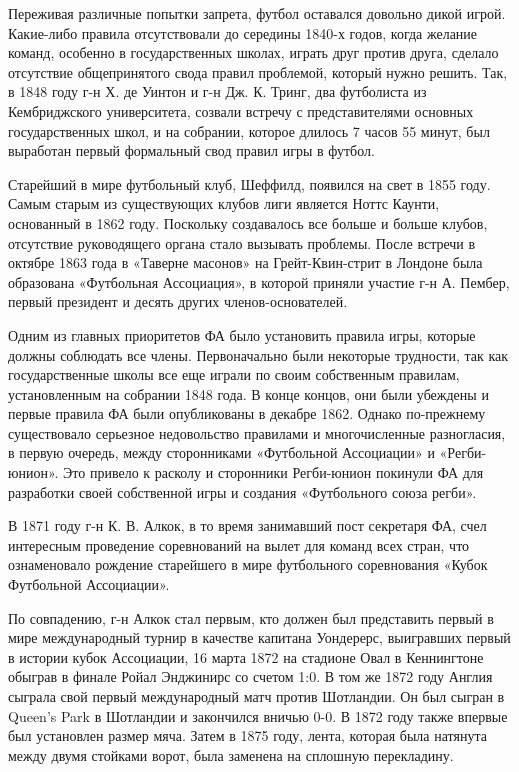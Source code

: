 Переживая различные попытки запрета, футбол оставался довольно дикой игрой. Какие-либо правила отсутствовали до середины 1840-х годов, когда желание команд, особенно в государственных школах, играть друг против друга, сделало отсутствие общепринятого свода правил проблемой, который нужно решить. Так, в 1848 году г-н Х. де Уинтон и г-н Дж. К. Тринг, два футболиста из Кембриджского университета, созвали встречу с представителями основных государственных школ, и на собрании, которое длилось 7 часов 55 минут, был выработан первый формальный свод правил игры в футбол.

Старейший в мире футбольный клуб, Шеффилд, появился на свет в 1855 году. Самым старым из существующих клубов лиги является Ноттс Каунти,  основанный в 1862 году. Поскольку создавалось все больше и больше клубов, отсутствие руководящего органа стало вызывать проблемы. После встречи в октябре 1863 года в «Таверне масонов» на Грейт-Квин-стрит в Лондоне была образована «Футбольная Ассоциация», в которой приняли участие г-н А. Пембер, первый президент и десять других членов-основателей.

Одним из главных приоритетов ФА было установить правила игры, которые должны соблюдать все члены. Первоначально были некоторые трудности, так как государственные школы все еще играли по своим собственным правилам, установленным на собрании 1848 года. В конце концов, они были убеждены и первые правила ФА были опубликованы в декабре 1862. Однако по-прежнему существовало серьезное недовольство правилами и многочисленные разногласия, в первую очередь, между сторонниками «Футбольной Ассоциации» и «Регби-юнион». Это привело к расколу и сторонники Регби-юнион покинули ФА для разработки своей собственной игры и создания «Футбольного союза регби».

В 1871 году г-н К. В. Алкок, в то время занимавший пост секретаря ФА, счел интересным проведение соревнований на вылет для команд всех стран, что ознаменовало рождение старейшего в мире футбольного соревнования «Кубок Футбольной Ассоциации».

По совпадению, г-н Алкок стал первым, кто должен был представить первый в мире международный турнир в качестве капитана Уондерерс, выигравших первый в истории кубок Ассоциации, 16 марта 1872 на стадионе Овал в Кеннингтоне обыграв в финале Ройал Энджинирс со счетом 1:0. В том же 1872 году Англия сыграла свой первый международный матч против Шотландии. Он был сыгран в Queen's Park в Шотландии и закончился вничью 0-0. В 1872 году также впервые был установлен размер мяча. Затем в 1875 году, лента, которая была натянута между двумя стойками ворот, была заменена на сплошную перекладину.

